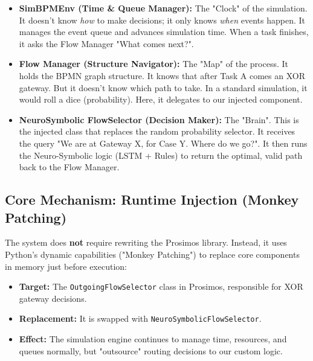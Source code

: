 \documentclass[a4paper]{article}
\begin{document}
\begin{itemize}
    \item \textbf{SimBPMEnv (Time \& Queue Manager):} The "Clock" of the simulation. It doesn't know \textit{how} to make decisions; it only knows \textit{when} events happen. It manages the event queue and advances simulation time. When a task finishes, it asks the Flow Manager "What comes next?".
    
    \item \textbf{Flow Manager (Structure Navigator):} The "Map" of the process. It holds the BPMN graph structure. It knows that after Task A comes an XOR gateway. But it doesn't know which path to take. In a standard simulation, it would roll a dice (probability). Here, it delegates to our injected component.
    
    \item \textbf{NeuroSymbolic FlowSelector (Decision Maker):} The "Brain". This is the injected class that replaces the random probability selector. It receives the query "We are at Gateway X, for Case Y. Where do we go?". It then runs the Neuro-Symbolic logic (LSTM + Rules) to return the optimal, valid path back to the Flow Manager.
\end{itemize}

\subsection{Core Mechanism: Runtime Injection (Monkey Patching)}
The system does \textbf{not} require rewriting the Prosimos library. Instead, it uses Python's dynamic capabilities ("Monkey Patching") to replace core components in memory just before execution:
\begin{itemize}
    \item \textbf{Target:} The \texttt{OutgoingFlowSelector} class in Prosimos, responsible for XOR gateway decisions.
    \item \textbf{Replacement:} It is swapped with \texttt{NeuroSymbolicFlowSelector}.
    \item \textbf{Effect:} The simulation engine continues to manage time, resources, and queues normally, but "outsource" routing decisions to our custom logic.
\end{itemize}
\end{document}

